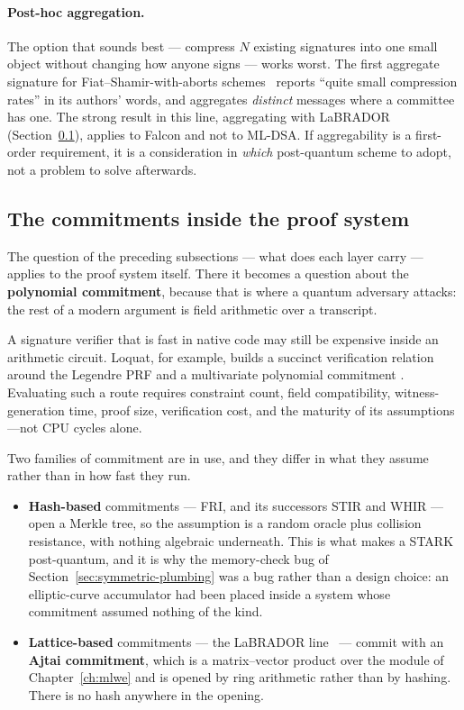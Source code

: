 \paragraph{Post-hoc aggregation.}
The option that sounds best --- compress $N$ existing signatures into one small
object without changing how anyone signs --- works worst. The first aggregate
signature for Fiat--Shamir-with-aborts schemes~\cite{boudgousttakahashi2023}
reports ``quite small compression rates'' in its authors' words, and aggregates
\emph{distinct} messages where a committee has one. The strong result in this
line, aggregating with LaBRADOR (Section~\ref{sec:pq-proof-systems}), applies
to Falcon and not to ML-DSA. If aggregability is a first-order requirement, it
is a consideration in \emph{which} post-quantum scheme to adopt, not a problem
to solve afterwards.

\subsection{The commitments inside the proof system}
\label{sec:pq-proof-systems}
The question of the preceding subsections --- what does each layer carry ---
applies to the proof system itself. There it becomes a question about the
\textbf{polynomial commitment}, because that is where a quantum adversary
attacks: the rest of a modern argument is field arithmetic over a transcript.

A signature verifier that is fast in native code may still be expensive inside
an arithmetic circuit. Loquat, for example, builds a succinct verification
relation around the Legendre PRF and a multivariate polynomial commitment
\cite{loquat2024}. Evaluating such a route requires constraint count, field
compatibility, witness-generation time, proof size, verification cost, and the
maturity of its assumptions---not CPU cycles alone.

Two families of commitment are in use, and they differ in what they assume
rather than in how fast they run.

\begin{itemize}
  \item \textbf{Hash-based} commitments --- FRI, and its successors STIR and
        WHIR --- open a Merkle tree, so the assumption is a random oracle plus
        collision resistance, with nothing algebraic underneath. This is what
        makes a STARK post-quantum, and it is why the memory-check bug of
        Section~\ref{sec:symmetric-plumbing} was a bug rather than a design
        choice: an elliptic-curve accumulator had been placed inside a system
        whose commitment assumed nothing of the kind.
  \item \textbf{Lattice-based} commitments --- the LaBRADOR
        line~\cite{labrador2023} --- commit with an \textbf{Ajtai commitment},
        which is a matrix--vector product over the module of
        Chapter~\ref{ch:mlwe} and is opened by ring arithmetic rather than by
        hashing. There is no hash anywhere in the opening.
\end{itemize}

